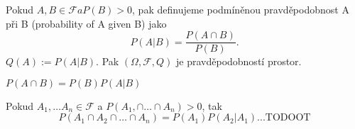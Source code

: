 \documentclass[../main.tex]{subfiles}
\begin{document}
\begin{definition}

    Pokud $A,B \in \mathcal{F} a P(B) > 0$, pak definujeme podmíněnou pravděpodobnost A při B (probability of A given B) jako
    \[P(A|B) = \frac{P(A\cap B)}{P(B)}.\]
    $Q(A):= P(A|B).$ Pak $(\Omega, \mathcal{F},Q)$ je pravděpodobností prostor.
\end{definition}

\begin{definition}
    $P(A\cap B) = P(B)P(A|B)$
\end{definition}

\begin{theorem}
    Pokud $A_1,\dots A_n \in \mathcal{F}$ a $P(A_1, \cap \dots \cap A_n)> 0$, tak
    \[P(A_1\cap A_2 \cap \dots \cap A_n) = P(A_1)P(A_2|A_1) ... \text{TODOOT}\]
\end{theorem}
\end{document}
